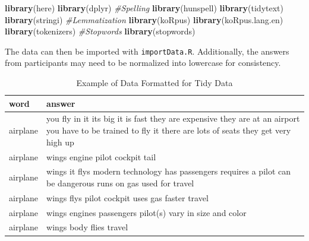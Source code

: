 \documentclass[man]{apa6}
\newenvironment{Shaded}{\begin{snugshade}}{\end{snugshade}}
\newcommand{\CommentTok}[1]{\textcolor[rgb]{0.56,0.35,0.01}{\textit{#1}}}
\newcommand{\DataTypeTok}[1]{\textcolor[rgb]{0.13,0.29,0.53}{#1}}
\newcommand{\KeywordTok}[1]{\textcolor[rgb]{0.13,0.29,0.53}{\textbf{#1}}}
\newcommand{\NormalTok}[1]{#1}
\newcommand{\OperatorTok}[1]{\textcolor[rgb]{0.81,0.36,0.00}{\textbf{#1}}}
\newcommand{\StringTok}[1]{\textcolor[rgb]{0.31,0.60,0.02}{#1}}
\begin{document}
\scriptsize

\begin{Shaded}
\begin{Highlighting}[]
\KeywordTok{library}\NormalTok{(here)}
\KeywordTok{library}\NormalTok{(dplyr)}
\CommentTok{#Spelling}
\KeywordTok{library}\NormalTok{(hunspell)}
\KeywordTok{library}\NormalTok{(tidytext)}
\KeywordTok{library}\NormalTok{(stringi)}
\CommentTok{#Lemmatization}
\KeywordTok{library}\NormalTok{(koRpus) }
\KeywordTok{library}\NormalTok{(koRpus.lang.en)}
\KeywordTok{library}\NormalTok{(tokenizers)}
\CommentTok{#Stopwords}
\KeywordTok{library}\NormalTok{(stopwords)}
\end{Highlighting}
\end{Shaded}

\normalsize

The data can then be imported with \texttt{importData.R}. Additionally, the answers from participants may need to be normalized into lowercase for consistency.

\scriptsize

\begin{Shaded}
\end{Shaded}

\normalsize

\begin{table}[t]

\caption{\label{tab:tab1}Example of Data Formatted for Tidy Data}
\centering
\begin{tabular}{l>{\raggedright\arraybackslash}p{30em}}
\toprule
word & answer\\
\midrule
airplane & you fly in it  its big  it is fast  they are expensive  they are at an airport  you have to be trained to fly it  there are lots of seats  they get very high up\\
airplane & wings engine pilot cockpit tail\\
airplane & wings  it flys  modern technology  has passengers  requires a pilot  can be dangerous  runs on gas  used for travel\\
airplane & wings  flys  pilot  cockpit  uses gas  faster travel\\
airplane & wings  engines  passengers  pilot(s)  vary in size and color\\
\addlinespace
airplane & wings  body  flies  travel\\
\bottomrule
\end{tabular}
\end{table}
\end{document}
